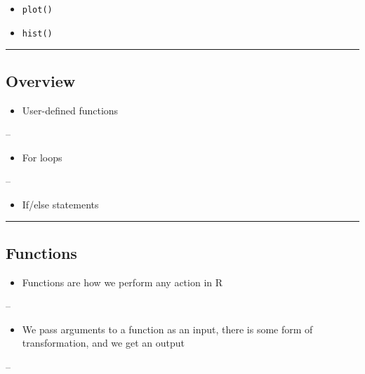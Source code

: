 \documentclass[]{article}
\providecommand{\tightlist}{%
  \setlength{\itemsep}{0pt}\setlength{\parskip}{0pt}}
\begin{document}
\begin{itemize}
\tightlist
\item
  \texttt{plot()}
\item
  \texttt{hist()}
\end{itemize}

\begin{center}\rule{0.5\linewidth}{\linethickness}\end{center}

\hypertarget{overview}{%
\subsection{Overview}\label{overview}}

\begin{itemize}
\tightlist
\item
  User-defined functions
\end{itemize}

--

\begin{itemize}
\tightlist
\item
  For loops
\end{itemize}

--

\begin{itemize}
\tightlist
\item
  If/else statements
\end{itemize}

\begin{center}\rule{0.5\linewidth}{\linethickness}\end{center}

\hypertarget{functions}{%
\subsection{Functions}\label{functions}}

\begin{itemize}
\tightlist
\item
  Functions are how we perform any action in R
\end{itemize}

--

\begin{itemize}
\tightlist
\item
  We pass arguments to a function as an input, there is some form of
  transformation, and we get an output
\end{itemize}

--
\end{document}
